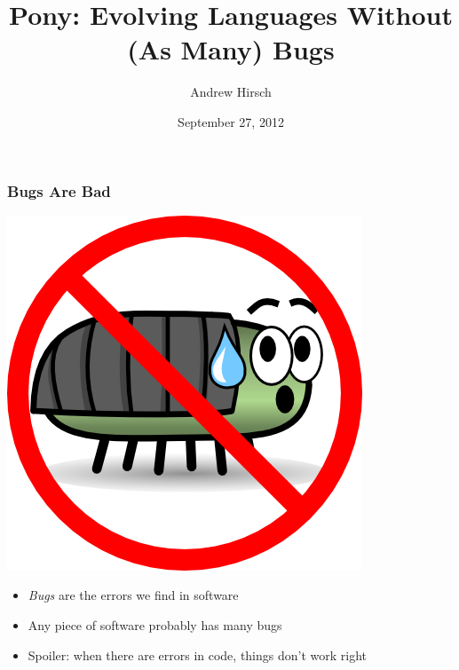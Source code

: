 \documentclass[bigger]{beamer}
\institute{The George Washington University}
\title{Pony: Evolving Languages Without (As Many) Bugs}
\author{Andrew Hirsch}
\date{September 27, 2012}
\begin{document}
\maketitle




\begin{frame}
\frametitle{Bugs Are Bad}
\label{sec-1}


\includegraphics{../pictures/no_bug.png}


\begin{itemize}
\item \emph{Bugs} are the errors we find in software
\item Any piece of software probably has many bugs
\item Spoiler: when there are errors in code, things don't work right
\end{itemize}
\end{frame}
\end{document}
